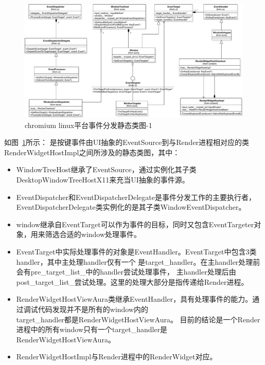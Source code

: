 \documentclass[12pt]{article}
\begin{document}

\begin{figure}[H] 
  \centering 
  \includegraphics[width=\textwidth]{image/linux_event_dispatch_class_2.pdf} 
  \caption{chromium linux平台事件分发静态类图-1} \label{fig:linux_event_dispatch_class_2} 
\end{figure}

如图~\ref{fig:linux_event_dispatch_class_2}所示：
是按键事件由UI抽象的EventSource到与Render进程相对应的类RenderWidgetHostImpl之间所涉及的静态类图，其中：
\begin{itemize}
  \item WindowTreeHost继承了EventSource，通过实例化其子类DesktopWindowTreeHostX11来充当UI抽象的事件源。
  \item EventDispatcher和EventDispatcherDelegate是事件分发工作的主要执行者，
  EventDispatcherDelegate类实例化的是其子类WindowEventDispatcher。
  \item window继承自EventTarget可以作为事件的目标，同时又包含EventTargeter对象，用来筛选合适的window处理事件。
  \item EventTarget中实际处理事件的对象是EventHandler。EventTarget中包含3类handler，其中主处理handler仅有一个
  是target\_handler。在主handler处理前会有pre\_target\_list\_中的handler尝试处理事件，
  主handler处理后由post\_target\_list\_尝试处理。这里的处理大部分是指传递给Render进程。
  \item RenderWidgetHostViewAura类继承EventHandler，具有处理事件的能力。通过调试代码发现并不是所有的window内的\\
  target\_handler都是RenderWidgetHostViewAura。
  目前的结论是一个Render进程中的所有window只有一个target\_handler是RenderWidgetHostViewAura。
  \item RenderWidgetHostImpl与Render进程中的RenderWidget对应。
\end{itemize}
\end{document}
